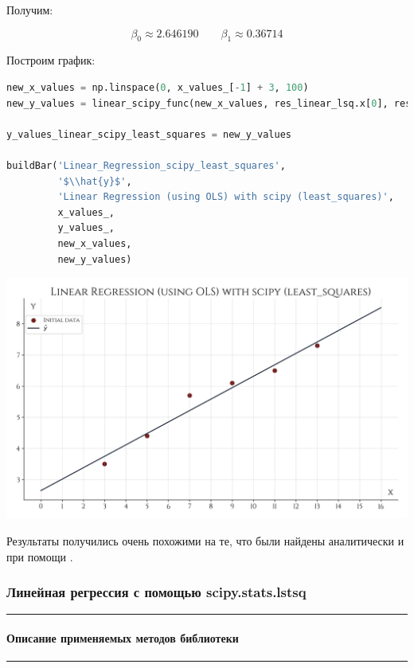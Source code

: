 \documentclass[a4paper, 14pt]{extarticle}
\begin{document}
Получим:

\begin{equation*}
    \beta_0 \approx 2.646190 \qquad \beta_1 \approx 0.36714
\end{equation*}

Построим график:

\begin{center}
    \begin{lstlisting}[language=Python]
new_x_values = np.linspace(0, x_values_[-1] + 3, 100)
new_y_values = linear_scipy_func(new_x_values, res_linear_lsq.x[0], res_linear_lsq.x[1])

y_values_linear_scipy_least_squares = new_y_values

buildBar('Linear_Regression_scipy_least_squares', 
         '$\\hat{y}$', 
         'Linear Regression (using OLS) with scipy (least_squares)', 
         x_values_, 
         y_values_,
         new_x_values, 
         new_y_values)
    \end{lstlisting}
\end{center}

\begin{center}
    \includegraphics[width=1\textwidth, height=1\textheight, keepaspectratio]{Linear_Regression_scipy_least_squares} \\
\end{center}

Результаты получились очень похожими на те, что были найдены аналитически и при помощи .

\subsubsection*{{Линейная регрессия с помощью scipy.stats.lstsq}}\vspace{-20pt}\rule{\linewidth}{0.1mm}
\vspace{-30pt}\paragraph*{{Описание применяемых методов библиотеки}}\vspace{-20pt}\rule{\linewidth}{0.1mm}
\end{document}
